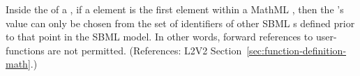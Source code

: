 Inside the  of a \FunctionDefinition, if a
 element is the first element within a MathML
, then the 's value can only be chosen from
the set of identifiers of other SBML \FunctionDefinition{}s
defined prior to that point in the SBML model.  In other words,
forward references to user-functions are not permitted.
(References: L2V2 Section~\ref{sec:function-definition-math}.)
